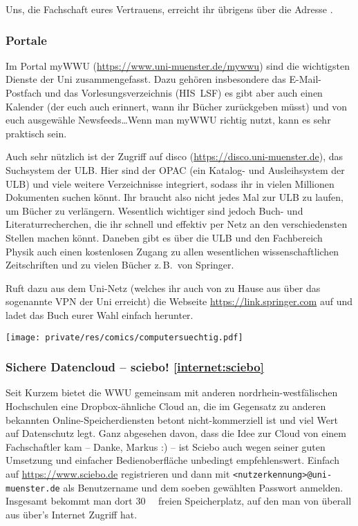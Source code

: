 \begin{multicols*}{2}
Uns, die Fachschaft eures Vertrauens, erreicht ihr übrigens über die Adresse .

\subsubsection{Portale}
Im Portal myWWU (\url{https://www.uni-muenster.de/mywwu}) sind die wichtigsten Dienste der Uni zusammengefasst.
Dazu gehören insbesondere das E-Mail-Postfach und das Vorlesungsverzeichnis (HIS~LSF) es gibt aber auch einen Kalender (der euch auch erinnert, wann ihr Bücher zurückgeben müsst) und von euch ausgewähle Newsfeeds\dots Wenn man myWWU richtig nutzt, kann es sehr praktisch sein.

Auch sehr nützlich ist der Zugriff auf disco (\url{https://disco.uni-muenster.de}), das Suchsystem der ULB.
Hier sind der OPAC (ein Katalog- und Ausleihsystem der ULB) und viele weitere Verzeichnisse integriert, sodass ihr in vielen Millionen Dokumenten suchen könnt.
Ihr braucht also nicht jedes Mal zur ULB zu laufen, um Bücher zu verlängern.
Wesentlich wichtiger sind jedoch Buch- und Literaturrecherchen, die ihr schnell und effektiv per Netz an den verschiedensten Stellen machen könnt.
Daneben gibt es über die ULB und den Fachbereich Physik auch einen kostenlosen Zugang zu allen wesentlichen wissenschaftlichen Zeitschriften und zu vielen Bücher z.\,B.\ von Springer.

Ruft dazu aus dem Uni-Netz (welches ihr auch von zu Hause aus über das sogenannte VPN der Uni erreicht) die Webseite \url{https://link.springer.com} auf und ladet das Buch eurer Wahl einfach herunter.

\begin{center}
	\texttt{[image: private/res/comics/computersuechtig.pdf]}
\end{center}

\subsubsection[Sichere Datencloud -- sciebo!]{Sichere Datencloud -- sciebo! \cref{internet:sciebo}}
Seit Kurzem bietet die WWU gemeinsam mit anderen nordrhein-westfälischen Hochschulen eine Dropbox-ähnliche Cloud an, die im Gegensatz zu anderen bekannten Online-Speicherdiensten betont nicht-kommerziell ist und viel Wert auf Datenschutz legt.
Ganz abgesehen davon, dass die Idee zur Cloud von einem Fachschaftler kam -- Danke, Markus :) -- ist Sciebo auch wegen seiner guten Umsetzung und einfacher Bedienoberfläche unbedingt empfehlenswert.
Einfach auf \url{https://www.sciebo.de} registrieren und dann mit \texttt{<nutzerkennung>@uni-muenster.de} als Benutzername und dem soeben gewählten Passwort anmelden.
Insgesamt bekommt man dort \SI{30}{\giga\byte} freien Speicherplatz, auf den man von überall aus über's Internet Zugriff hat.


\end{multicols*}
